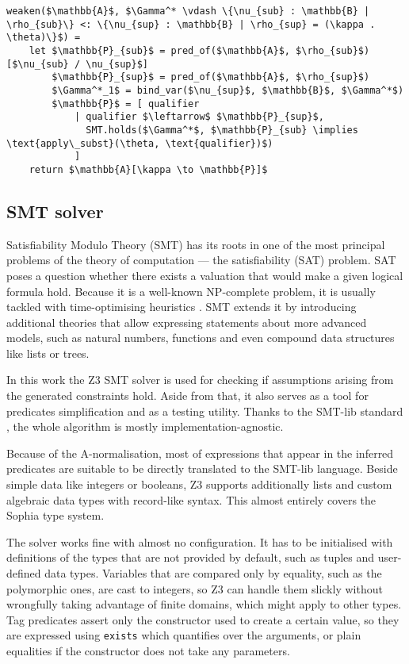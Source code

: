 \begin{lstlisting}[language=pseudocode]
weaken($\mathbb{A}$, $\Gamma^* \vdash \{\nu_{sub} : \mathbb{B} | \rho_{sub}\} <: \{\nu_{sup} : \mathbb{B} | \rho_{sup} = (\kappa . \theta)\}$) =
    let $\mathbb{P}_{sub}$ = pred_of($\mathbb{A}$, $\rho_{sub}$)[$\nu_{sub} / \nu_{sup}$]
        $\mathbb{P}_{sup}$ = pred_of($\mathbb{A}$, $\rho_{sup}$)
        $\Gamma^*_1$ = bind_var($\nu_{sup}$, $\mathbb{B}$, $\Gamma^*$)
        $\mathbb{P}$ = [ qualifier
            | qualifier $\leftarrow$ $\mathbb{P}_{sup}$,
              SMT.holds($\Gamma^*$, $\mathbb{P}_{sub} \implies \text{apply\_subst}(\theta, \text{qualifier})$)
            ]
    return $\mathbb{A}[\kappa \to \mathbb{P}]$
\end{lstlisting}

\subsection{SMT solver}
\label{sub:solving}

Satisfiability Modulo Theory (SMT) has its roots in one of the most principal
problems of the theory of computation --- the satisfiability (SAT) problem. SAT
poses a question whether there exists a valuation that would make a given
logical formula hold. Because it is a well-known NP-complete
\cite{10.1145/800157.805047} problem, it is usually tackled with time-optimising
heuristics \cite{cdcl, dpll}. SMT extends it by introducing additional theories
that allow expressing statements about more advanced models, such as natural
numbers, functions and even compound data structures like lists or trees.

In this work the Z3 SMT solver is used for checking if assumptions arising from
the generated constraints hold. Aside from that, it also serves as a tool for
predicates simplification and as a testing utility. Thanks to the SMT-lib
standard \cite{smt_lib}, the whole algorithm is mostly implementation-agnostic.

Because of the A-normalisation, most of expressions that appear in the inferred
predicates are suitable to be directly translated to the SMT-lib language.
Beside simple data like integers or booleans, Z3 supports additionally lists and
custom algebraic data types with record-like syntax. This almost entirely covers
the Sophia type system.

The solver works fine with almost no configuration. It has to be initialised
with definitions of the types that are not provided by default, such as tuples
and user-defined data types. Variables that are compared only by equality, such
as the polymorphic ones, are cast to integers, so Z3 can handle them slickly
without wrongfully taking advantage of finite domains, which might apply to
other types. Tag predicates assert only the constructor used to create a certain
value, so they are expressed using \texttt{exists} which quantifies over
the arguments, or plain equalities if the constructor does not take any
parameters.


